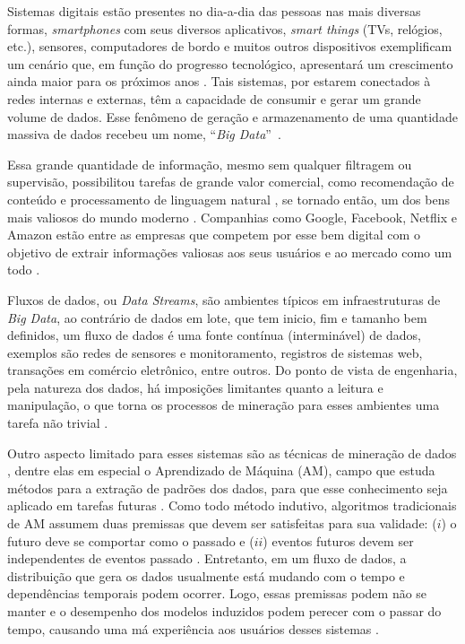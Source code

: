 Sistemas digitais estão presentes no dia-a-dia das pessoas nas mais diversas formas, \textit{smartphones} com seus diversos aplicativos, \textit{smart things} (TVs,
relógios, etc.), sensores, computadores de bordo e muitos outros dispositivos exemplificam um cenário que, em função do progresso tecnológico, apresentará um crescimento ainda maior para os próximos anos \cite{owidtechnologyadoption,atzori2010internet}. Tais sistemas, por estarem conectados à redes
internas e externas, têm a capacidade de consumir e gerar um grande volume de dados. Esse fenômeno de geração e armazenamento de uma quantidade massiva de
dados recebeu um nome, ``\textit{Big Data}''~\cite{mcafee2012big, dean2008mapreduce}.

Essa grande quantidade de informação, mesmo sem qualquer filtragem ou supervisão, possibilitou tarefas de grande valor comercial, como recomendação de conteúdo e processamento de linguagem natural \cite{halevy2009unreasonable}, se tornado então, um dos bens mais valiosos do mundo moderno \cite{economist2017world}. Companhias como Google\regsymbol{}, Facebook\regsymbol{}, Netflix\regsymbol{} e Amazon\regsymbol{} estão entre as empresas que competem por esse bem digital com o objetivo de extrair informações valiosas aos seus usuários e ao mercado como um todo \cite{tarnoff2018big, finger2014data}.

Fluxos de dados, ou \textit{Data Streams}, são ambientes típicos em infraestruturas de \textit{Big Data}, ao contrário de dados em lote, que tem inicio, fim e tamanho bem definidos, um fluxo de dados é uma fonte contínua (interminável) de dados, exemplos são redes de sensores e monitoramento, registros de sistemas web, transações em comércio eletrônico, entre outros. Do ponto de vista de engenharia, pela natureza dos dados, há imposições limitantes quanto a leitura e manipulação, o que torna os processos de mineração para esses
ambientes uma tarefa não trivial \cite{gama2007learning}.

Outro aspecto limitado para esses sistemas são as técnicas de mineração de dados \cite{gama2007learning}, dentre elas em especial o Aprendizado de Máquina (AM), campo que estuda métodos para a extração de padrões dos dados, para que esse conhecimento seja aplicado em tarefas futuras \cite{mitchell1997machine,friedman2001elements}. Como todo método indutivo, algoritmos tradicionais de AM assumem duas premissas que devem ser satisfeitas para sua validade: ($i$) o futuro deve se comportar como o passado e ($ii$) eventos futuros devem ser independentes de eventos passado \cite{vapnik2013nature}. Entretanto, em um fluxo de dados, a distribuição que gera os dados usualmente está mudando com o tempo e dependências temporais podem ocorrer.  Logo, essas premissas podem não se manter e o desempenho dos modelos induzidos podem perecer com o passar do tempo, causando uma má experiência aos usuários desses sistemas \cite{gama2007learning, Johansson2014}.

